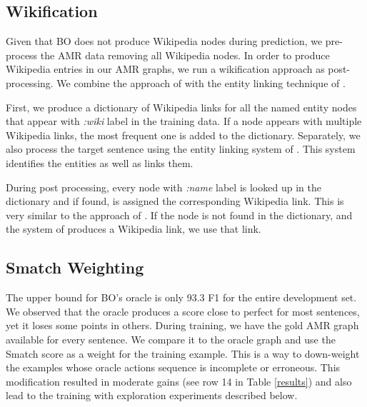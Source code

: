 \documentclass[11pt,a4paper]{article}
\begin{document}
\begin{table*}[!ht]
{\begin{tabular}{|l|l||c|c|c|c|c|c|c|c|c|}
\end{tabular}

}
\caption{Results, including comparison with the best systems, in the LDC2017T10 test set (aka AMR 2.0). Results highlighted in bold are the best in each metric. BO is \cite{D17-1130} (which did not produce wikification). (JAMR) means that the model uses JAMR alignments, the rest use our alignments. Metrics by  and .}
\label{results}

\end{table*}


\subsection{Wikification}

Given that BO does not produce Wikipedia nodes during prediction, we pre-process the AMR data removing all Wikipedia nodes. In order to produce Wikipedia entries in our AMR graphs, we run a wikification approach as post-processing. We combine the approach of  with the entity linking technique of . 

First, we produce a dictionary of Wikipedia links for all the named entity nodes that appear with \emph{:wiki} label in the training data. If a node appears with multiple Wikipedia links, the most frequent one is added to the dictionary. Separately, we also process the target sentence using the entity linking system of . This system identifies the entities as well as links them. 

During post processing, every node with \emph{:name} label is looked up in the dictionary and if found, is assigned the corresponding Wikipedia link. This is very similar to the approach of . If the node is not found in the dictionary, and the system of  produces a Wikipedia link, we use that link.

\subsection{Smatch Weighting}

The upper bound for BO's oracle is only 93.3 F1 for the entire development set. We observed that the oracle produces a score close to perfect for most sentences, yet it loses some points in others. During training, we have the gold AMR graph available for every sentence. We compare it to the oracle graph and use the Smatch score as a weight for the training example. This is a way to down-weight the examples whose oracle actions sequence is incomplete or erroneous. This modification resulted in moderate gains (see row 14 in Table \ref{results}) and also lead to the training with exploration experiments described below.
\end{document}
